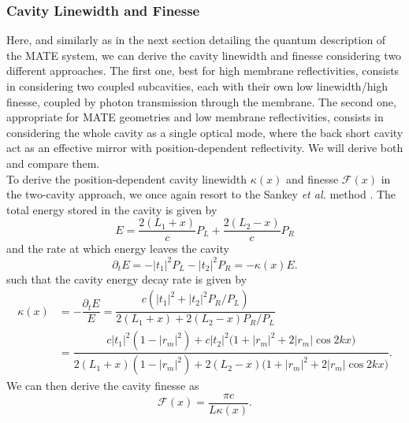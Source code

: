 \subsubsection{Cavity Linewidth and Finesse}
Here, and similarly as in the next section detailing the quantum description of the MATE system, we can derive the cavity linewidth and finesse considering two different approaches. The first one, best for high membrane reflectivities, consists in considering two coupled subcavities, each with their own low linewidth/high finesse, coupled by photon transmission through the membrane. The second one, appropriate for MATE geometries and low membrane reflectivities, consists in considering the whole cavity as a single optical mode, where the back short cavity act as an effective mirror with position-dependent reflectivity. We will derive both and compare them. \\

To derive the position-dependent cavity linewidth $\kappa(x)$ and finesse $\mathcal{F}(x)$ in the two-cavity approach, we once again resort to the Sankey \textit{et al.} method \cite{sankey_strong_2010}. The total energy stored in the cavity is given by
\begin{equation}
  E = \dfrac{2(L_1+x)}{c} P_L + \dfrac{2(L_2 - x)}{c} P_R
\end{equation}
and the rate at which energy leaves the cavity 
\begin{equation}
  \partial_t E = - |t_1|^2 P_L  -|t_2|^2 P_R = - \kappa(x) E.
\end{equation}
such that the cavity energy decay rate is given by
\begin{equation}
  \begin{split}
  \kappa(x) & = - \dfrac{\partial_t E}{E} = \dfrac{c (|t_1|^2 + |t_2|^2 P_R/P_L)}{2(L_1+x) + 2(L_2 - x) P_R/P_L} \\
  & = \dfrac{c|t_1|^2 (1-|r_m|^2) + c|t_2|^2 \bigl(1 + |r_m|^2 + 2|r_m|\cos 2kx \bigr)}{2(L_1+x)(1-|r_m|^2) + 2(L_2 - x)\bigl(1 + |r_m|^2 + 2|r_m|\cos 2kx \bigr)}.
  \end{split}
  \label{eq:kappa_mate}
\end{equation}
We can then derive the cavity finesse as
\begin{equation}
  \mathcal{F}(x) = \dfrac{\pi c}{ L \kappa(x)}.
\end{equation}

